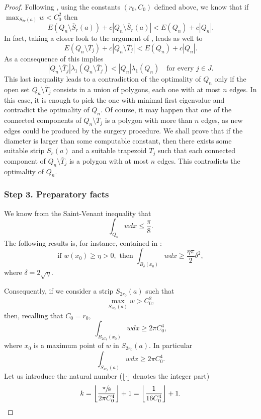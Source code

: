 \documentclass[JEP,XML,SOM,Unicode,ThmDefs,NoFloatCountersInSection,published]{cedram}
\theoremstyle{plain}
\theoremstyle{definition}
\newcommand{\lb}{\lambda}
\newcommand{\sm}{\setminus}
\newcommand{\ov}{\overline}
\begin{document}
\begin{proof}
Following \cite[Cor.\,4.3]{BuMa15}, using the constants $(r_0, C_0)$ defined above, we know that
if $\max_{S_{2r}(a) } w <C_0^2$ then
\begin{equation}\label{bb62}
E(Q_n\sm \ov S_{r}(a))+c |Q_n\sm \ov S_{r}(a)|< E(Q_n)+c |Q_n|.
\end{equation}
In fact, taking a closer look to the argument of \cite[Cor.\,4.3]{BuMa15}, leads as well to
\begin{equation}\label{bb62.5}
E(Q_n\sm \ov T_j)+c |Q_n\sm \ov T_j|< E(Q_n)+c |Q_n|.
\end{equation}
As a consequence of \cite[Lem.\,3.1]{BuMa15} this implies
\[
|Q_n\sm \ov T_j|\lb_1(Q_n\sm \ov T_j) < |Q_n| \lb_1(Q_n) \quad\text{for every } j \in J.
\]
This last inequality leads to a contradiction of the optimality of $Q_n$ only if the open set $Q_n\sm \ov T_j$ consists in a union of polygons, each one with at most $n$ edges. In this case, it is enough to pick the one with minimal first eigenvalue and contradict the optimality of $Q_n$. Of course, it may happen that one of the connected components of $Q_n\sm \ov T_j$ is a polygon with more than $n$ edges, as new edges could be produced by the surgery procedure. We shall prove that if the diameter is larger than some computable constant, then there exists some suitable strip $S_{r}(a)$ and a suitable {trapezoid} $T_j$ such that each connected component of $Q_n\sm \ov T_j$ is a polygon with at most $n$ edges. This contradicts the optimality of $Q_n$.

\subsubsection*{Step 3. Preparatory facts} We know from the Saint-Venant inequality \cite{Ma66} that
\[
\int_{Q_n} w dx \le \frac{\pi}{8}.
\]
The following results is, for instance, contained in \cite[Lem.\,2.2]{BuMa15}:
\[
\text{if } w(x_0) \ge \eta >0, \text{ then } \int _{B_\delta (x_0)} w dx\ge \frac{\eta \pi}{2} \delta^2,
\]
where $\delta = 2 \sqrt{\eta}$.

Consequently, if we consider a strip $S_{2r_0}(a)$ such that
\[
\max _{S_{2r_0}(a)} w >C_0^2,
\]
then, recalling that $C_0=r_0$,
\[
\int_{B_{2C_0} (x_0)} w dx \ge 2\pi C_0^4,
\]
where $x_0$ is a maximum point of $w$ in $S_{2r_0}(a)$. In particular
\[
\int_{S_{4r_0}(a)} w dx \ge 2\pi C_0^4.
\]
Let us introduce the natural number ($\lfloor \cdot \rfloor$ denotes the integer part)
\[
k= \left\lfloor\frac{\sfrac {\pi}{8}}{2\pi C_0^4}\right \rfloor +1= \left \lfloor\frac{1}{16C_0^4}\right \rfloor +1.
\]


\end{proof}
\end{document}
